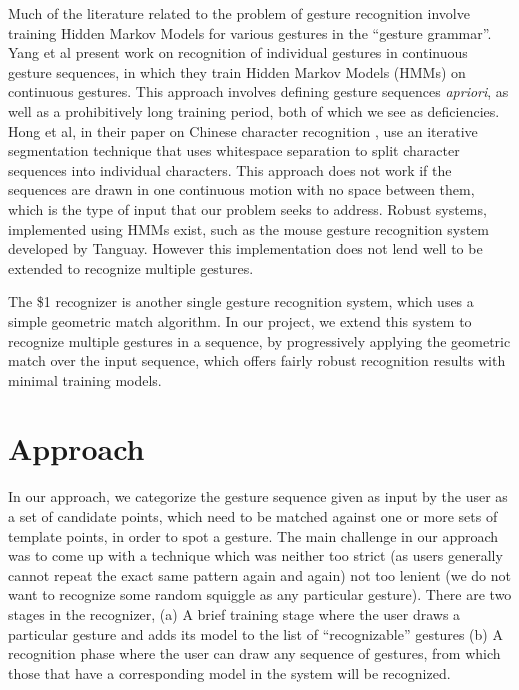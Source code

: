 \documentclass[twoside]{article}
\begin{document}
\begin{multicols}{2}
Much of the literature related to the problem of gesture recognition involve training 
Hidden Markov Models for various gestures in the ``gesture grammar''. 
Yang et al \cite{yang_gesture_1994} present work on recognition of individual 
gestures in continuous gesture sequences, in which they train Hidden
Markov Models (HMMs) on continuous gestures. This approach involves 
defining gesture sequences \textit{apriori}, as well as a prohibitively long training
period, both of which we see as deficiencies. Hong et al, 
in their paper on Chinese character recognition  \cite{hong1998segmentation}, use an iterative segmentation
technique that uses whitespace separation to split character sequences into
individual characters. This approach does not work if the sequences are drawn in one continuous motion
with no space between them, which is the type of input that our problem seeks to address. Robust systems, 
implemented using HMMs exist, such as the mouse gesture recognition system developed by
Tanguay\cite{tanguay_jr_hidden_1995}. However this implementation does not lend well to be extended to recognize
multiple gestures.

The \$1 recognizer \cite{wobbrock2007gestures} is another single gesture recognition system, which uses a simple geometric match algorithm. In our project, we extend this system to recognize multiple gestures in a sequence, by progressively applying the geometric match over the input sequence, which offers fairly robust recognition results
with minimal training models.

\section{Approach}

In our approach, we categorize the gesture sequence given as input by the user as a set of candidate points, which need to be matched against one or more sets of template points, in order to spot a gesture. The main challenge in our approach was to come up with a technique which was neither too strict (as users generally cannot repeat the exact same pattern again and again) not too lenient (we do not want to recognize some random squiggle as any particular gesture). There are two stages in the recognizer, (a) A brief training stage where the user draws a particular gesture and adds its model to the list of ``recognizable'' gestures (b) A recognition phase where the user can draw any sequence of gestures, from which those that have a corresponding model in the system will be recognized.


\end{multicols}
\end{document}
